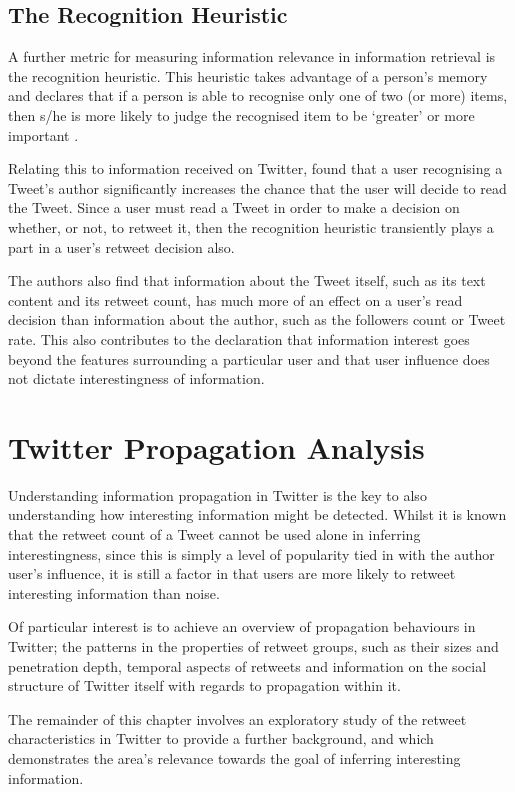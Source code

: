 \subsection{The Recognition Heuristic} 
A further metric for measuring information relevance in information retrieval is the recognition heuristic. This heuristic takes advantage of a person's memory and declares that if a person is able to recognise only one of two (or more) items, then s/he is more likely to judge the recognised item to be `greater' or more important \cite{oppenheimer03, goldstein99}.

Relating this to information received on Twitter, \citet{chorley12} found that a user recognising a Tweet's author significantly increases the chance that the user will decide to read the Tweet. Since a user must read a Tweet in order to make a decision on whether, or not, to retweet it, then the recognition heuristic transiently plays a part in a user's retweet decision also.

The authors also find that information about the Tweet itself, such as its text content and its retweet count, has much more of an effect on a user's read decision than information about the author, such as the followers count or Tweet rate. This also contributes to the declaration that information interest goes beyond the features surrounding a particular user and that user influence does not dictate interestingness of information.


\section{Twitter Propagation Analysis}
Understanding information propagation in Twitter is the key to also understanding how interesting information might be detected. Whilst it is known that the retweet count of a Tweet cannot be used alone in inferring interestingness, since this is simply a level of popularity tied in with the author user's influence, it is still a factor in that users are more likely to retweet interesting information than noise.

Of particular interest is to achieve an overview of propagation behaviours in Twitter; the patterns in the properties of retweet groups, such as their sizes and penetration depth, temporal aspects of retweets and information on the social structure of Twitter itself with regards to propagation within it.

The remainder of this chapter involves an exploratory study of the retweet characteristics in Twitter to provide a further background, and which demonstrates the area's relevance towards the goal of inferring interesting information.


